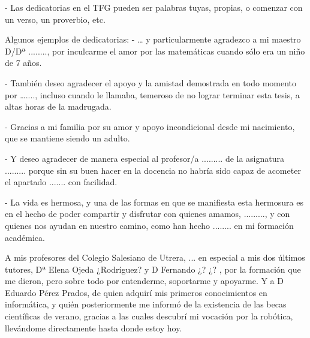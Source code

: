 - Las dedicatorias en el TFG pueden ser palabras tuyas, propias, o comenzar con un verso, un proverbio, etc.

Algunos ejemplos de dedicatorias:
- … y particularmente agradezco a mi maestro D/Dª ........, por inculcarme el amor por las matemáticas cuando sólo era un niño de 7 años.

- También deseo agradecer el apoyo y la amistad demostrada en todo momento por …...., incluso cuando le llamaba, temeroso de no lograr terminar esta tesis, a altas horas de la madrugada.

- Gracias a mi familia por su amor y apoyo incondicional desde mi nacimiento, que se mantiene siendo un adulto.

- Y deseo agradecer de manera especial al profesor/a ......... de la asignatura ......... porque sin su buen hacer en la docencia no habría sido capaz de acometer el apartado ....... con facilidad.

- La vida es hermosa, y una de las formas en que se manifiesta esta hermosura es en el hecho de poder compartir y disfrutar con quienes amamos, ........., y con quienes nos ayudan en nuestro camino, como han hecho ........ en mi formación académica.



A mis profesores del Colegio Salesiano de Utrera, ...
en especial a mis dos últimos tutores, Dª Elena Ojeda ¿Rodríguez? y D Fernando ¿? ¿? , por la formación que me dieron, pero sobre todo por entenderme, soportarme y apoyarme. Y a D Eduardo Pérez Prados, de quien adquirí mis primeros conocimientos en informática, y quién posteriormente me informó de la existencia de las becas científicas de verano, gracias a las cuales descubrí mi vocación por la robótica, llevándome directamente hasta donde estoy hoy.

{}%
\vspace{-.3cm}
{}%
{}%
